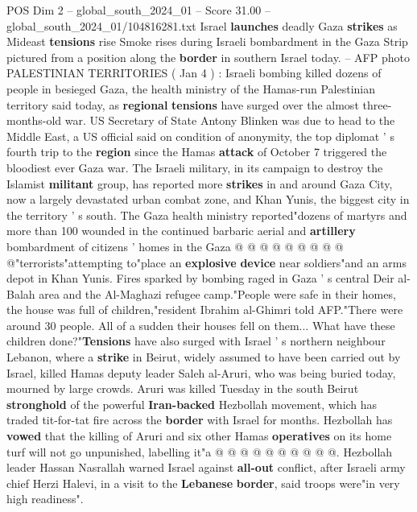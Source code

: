 \begin{textsample}{POS Dim 2 – global\_south\_2024\_01 – Score 31.00 – global\_south\_2024\_01/104816281.txt}  \label{ex:f2_pos_092}
Israel \textbf{launches} deadly Gaza \textbf{strikes} as Mideast \textbf{tensions} rise Smoke rises during Israeli bombardment in the Gaza Strip pictured from a position along the \textbf{border} in southern Israel today. -- AFP photo PALESTINIAN TERRITORIES ( Jan 4 ) : Israeli bombing killed dozens of people in besieged Gaza, the health ministry of the Hamas-run Palestinian territory said today, as \textbf{regional} \textbf{tensions} have surged over the almost three-months-old war.
US Secretary of State Antony Blinken was due to head to the Middle East, a US official said on condition of anonymity, the top diplomat ' s fourth trip to the \textbf{region} since the Hamas \textbf{attack} of October 7 triggered the bloodiest ever Gaza war.
The Israeli military, in its campaign to destroy the Islamist \textbf{militant} group, has reported more \textbf{strikes} in and around Gaza City, now a largely devastated urban combat zone, and Khan Yunis, the biggest city in the territory ' s south.
The Gaza health ministry reported"dozens of martyrs and more than 100 wounded in the continued barbaric aerial and \textbf{artillery} bombardment of citizens ' homes in the Gaza @ @ @ @ @ @ @ @ @ @"terrorists"attempting to"place an \textbf{explosive} \textbf{device} near soldiers"and an arms depot in Khan Yunis.
Fires sparked by bombing raged in Gaza ' s central Deir al-Balah area and the Al-Maghazi refugee camp."People were safe in their homes, the house was full of children,"resident Ibrahim al-Ghimri told AFP."There were around 30 people.
All of a sudden their houses fell on them...
What have these children done?"\textbf{Tensions} have also surged with Israel ' s northern neighbour Lebanon, where a \textbf{strike} in Beirut, widely assumed to have been carried out by Israel, killed Hamas deputy leader Saleh al-Aruri, who was being buried today, mourned by large crowds.
Aruri was killed Tuesday in the south Beirut \textbf{stronghold} of the powerful \textbf{Iran-backed} Hezbollah movement, which has traded tit-for-tat fire across the \textbf{border} with Israel for months.
Hezbollah has \textbf{vowed} that the killing of Aruri and six other Hamas \textbf{operatives} on its home turf will not go unpunished, labelling it"a @ @ @ @ @ @ @ @ @ @.
Hezbollah leader Hassan Nasrallah warned Israel against \textbf{all-out} conflict, after Israeli army chief Herzi Halevi, in a visit to the \textbf{Lebanese} \textbf{border}, said troops were"in very high readiness".

\end{textsample}
